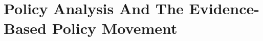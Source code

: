 \documentclass{beamer}
\begin{document}

\date[] %
{GiveWell\\
August 23rd, 2018}



\begin{frame}
  \titlepage
\end{frame}






 
\section[Evidence Based]{Policy Analysis And The Evidence-Based Policy Movement}
\end{document}
